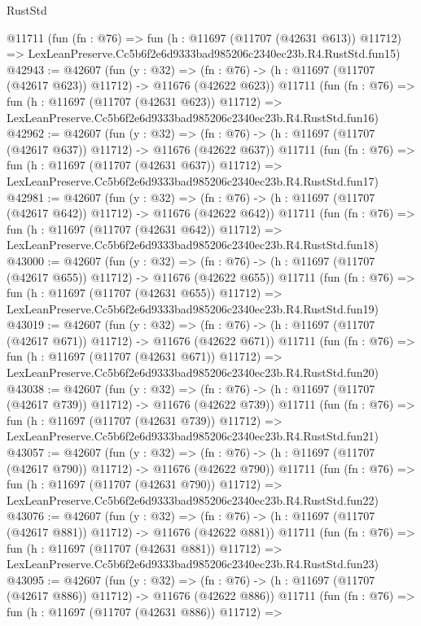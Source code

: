 \begin{lexlean}{RustStd}
\begin{coremodule}
    @11711
    (fun (fn : @76) =>
    fun (h : @11697 (@11707 (@42631 @613)) @11712) =>
    LexLeanPreserve.Cc5b6f2e6d9333bad985206c2340ec23b.R4.RustStd.fun15)
@42943 := @42607
    (fun (y : @32) =>
    (fn : @76) -> (h : @11697 (@11707 (@42617 @623)) @11712) -> @11676 (@42622 @623))
    @11711
    (fun (fn : @76) =>
    fun (h : @11697 (@11707 (@42631 @623)) @11712) =>
    LexLeanPreserve.Cc5b6f2e6d9333bad985206c2340ec23b.R4.RustStd.fun16)
@42962 := @42607
    (fun (y : @32) =>
    (fn : @76) -> (h : @11697 (@11707 (@42617 @637)) @11712) -> @11676 (@42622 @637))
    @11711
    (fun (fn : @76) =>
    fun (h : @11697 (@11707 (@42631 @637)) @11712) =>
    LexLeanPreserve.Cc5b6f2e6d9333bad985206c2340ec23b.R4.RustStd.fun17)
@42981 := @42607
    (fun (y : @32) =>
    (fn : @76) -> (h : @11697 (@11707 (@42617 @642)) @11712) -> @11676 (@42622 @642))
    @11711
    (fun (fn : @76) =>
    fun (h : @11697 (@11707 (@42631 @642)) @11712) =>
    LexLeanPreserve.Cc5b6f2e6d9333bad985206c2340ec23b.R4.RustStd.fun18)
@43000 := @42607
    (fun (y : @32) =>
    (fn : @76) -> (h : @11697 (@11707 (@42617 @655)) @11712) -> @11676 (@42622 @655))
    @11711
    (fun (fn : @76) =>
    fun (h : @11697 (@11707 (@42631 @655)) @11712) =>
    LexLeanPreserve.Cc5b6f2e6d9333bad985206c2340ec23b.R4.RustStd.fun19)
@43019 := @42607
    (fun (y : @32) =>
    (fn : @76) -> (h : @11697 (@11707 (@42617 @671)) @11712) -> @11676 (@42622 @671))
    @11711
    (fun (fn : @76) =>
    fun (h : @11697 (@11707 (@42631 @671)) @11712) =>
    LexLeanPreserve.Cc5b6f2e6d9333bad985206c2340ec23b.R4.RustStd.fun20)
@43038 := @42607
    (fun (y : @32) =>
    (fn : @76) -> (h : @11697 (@11707 (@42617 @739)) @11712) -> @11676 (@42622 @739))
    @11711
    (fun (fn : @76) =>
    fun (h : @11697 (@11707 (@42631 @739)) @11712) =>
    LexLeanPreserve.Cc5b6f2e6d9333bad985206c2340ec23b.R4.RustStd.fun21)
@43057 := @42607
    (fun (y : @32) =>
    (fn : @76) -> (h : @11697 (@11707 (@42617 @790)) @11712) -> @11676 (@42622 @790))
    @11711
    (fun (fn : @76) =>
    fun (h : @11697 (@11707 (@42631 @790)) @11712) =>
    LexLeanPreserve.Cc5b6f2e6d9333bad985206c2340ec23b.R4.RustStd.fun22)
@43076 := @42607
    (fun (y : @32) =>
    (fn : @76) -> (h : @11697 (@11707 (@42617 @881)) @11712) -> @11676 (@42622 @881))
    @11711
    (fun (fn : @76) =>
    fun (h : @11697 (@11707 (@42631 @881)) @11712) =>
    LexLeanPreserve.Cc5b6f2e6d9333bad985206c2340ec23b.R4.RustStd.fun23)
@43095 := @42607
    (fun (y : @32) =>
    (fn : @76) -> (h : @11697 (@11707 (@42617 @886)) @11712) -> @11676 (@42622 @886))
    @11711
    (fun (fn : @76) =>
    fun (h : @11697 (@11707 (@42631 @886)) @11712) =>

\end{coremodule}
\end{lexlean}
